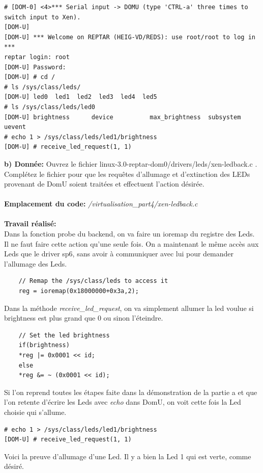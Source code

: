 \begin{lstlisting}
# [DOM-0] <4>*** Serial input -> DOMU (type 'CTRL-a' three times to switch input to Xen).
[DOM-U] 
[DOM-U] *** Welcome on REPTAR (HEIG-VD/REDS): use root/root to log in ***
reptar login: root
[DOM-U] Password: 
[DOM-U] # cd /
# ls /sys/class/leds/
[DOM-U] led0  led1  led2  led3  led4  led5
# ls /sys/class/leds/led0
[DOM-U] brightness      device          max_brightness  subsystem       uevent
# echo 1 > /sys/class/leds/led1/brightness 
[DOM-U] # receive_led_request(1, 1)
\end{lstlisting}
\textbf{b) Donnée: }Ouvrez le fichier linux-3.0-reptar-dom0/drivers/leds/xen-ledback.c . Complétez le fichier pour que
les requêtes d’allumage et d’extinction des LEDs provenant de DomU soient traitées et effectuent
l’action désirée.\\\\
\textbf{Emplacement du code: }\textit{/virtualisation\_part4/xen-ledback.c}\\\\
\textbf{Travail réalisé: }\\
Dans la fonction probe du backend, on va faire un ioremap du registre des Leds. Il ne faut faire cette action qu'une seule fois. On a maintenant le même accès aux Leds que le driver sp6, sans avoir à communiquer avec lui pour demander l'allumage des Leds.
\begin{lstlisting}
	// Remap the /sys/class/leds to access it
	reg = ioremap(0x18000000+0x3a,2);
\end{lstlisting}
Dans la méthode \textit{receive\_led\_request}, on va simplement allumer la led voulue si brightness est plus grand que 0 ou sinon l'éteindre.
\begin{lstlisting}
	// Set the led brightness
	if(brightness)
	*reg |= 0x0001 << id;
	else
	*reg &= ~ (0x0001 << id);
\end{lstlisting}
Si l'on reprend toutes les étapes faite dans la démonstration de la partie a et que l'on retente d'écrire les Leds avec \textit{echo} dans DomU, on voit cette fois la Led choisie qui s'allume.
\begin{lstlisting}
# echo 1 > /sys/class/leds/led1/brightness 
[DOM-U] # receive_led_request(1, 1)
\end{lstlisting}
Voici la preuve d'allumage d'une Led. Il y a bien la Led 1 qui est verte, comme désiré.
